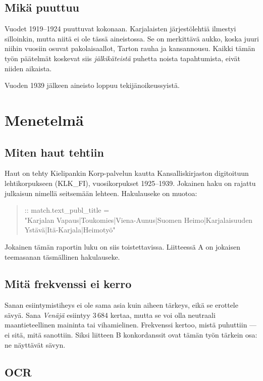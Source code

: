 \documentclass[10pt,a4paper]{article}
\begin{document}
\subsection{Mikä puuttuu}

Vuodet 1919--1924 puuttuvat kokonaan. Karjalaisten järjestölehtiä ilmestyi silloinkin,
mutta niitä ei ole tässä aineistossa. Se on merkittävä aukko, koska juuri niihin
vuosiin osuvat pakolaisaallot, Tarton rauha ja kansannousu. Kaikki tämän työn
päätelmät koskevat siis \emph{jälkikäteistä} puhetta noista tapahtumista, eivät
niiden aikaista.

Vuoden 1939 jälkeen aineisto loppuu tekijänoikeussyistä.

\section{Menetelmä}

\subsection{Miten haut tehtiin}

Haut on tehty Kielipankin Korp-palvelun kautta Kansalliskirjaston digitoituun
lehtikorpukseen (KLK\_FI), vuosikorpukset 1925--1939. Jokainen haku on rajattu
julkaisun nimellä seitsemään lehteen. Hakulauseke on muotoa:

\begin{quote}\small\ttfamily
[word="hakusana1|hakusana2" \%c] :: match.text\_publ\_title = \\
"Karjalan Vapaus|Toukomies|Viena-Aunus|Suomen Heimo|Karjalaisuuden Ystävä|Itä-Karjala|Heimotyö"
\end{quote}

Jokainen tämän raportin luku on siis toistettavissa. Liitteessä A on jokaisen
teemasanan täsmällinen hakulauseke.

\subsection{Mitä frekvenssi ei kerro}

Sanan esiintymistiheys ei ole sama asia kuin aiheen tärkeys, eikä se erottele
sävyä. Sana \emph{Venäjä} esiintyy 3\,684 kertaa, mutta se voi olla neutraali
maantieteellinen maininta tai vihamielinen. Frekvenssi kertoo, mistä puhuttiin ---
ei sitä, mitä sanottiin. Siksi liitteen B konkordanssit ovat tämän työn tärkein osa:
ne näyttävät sävyn.

\subsection{OCR}
\end{document}
